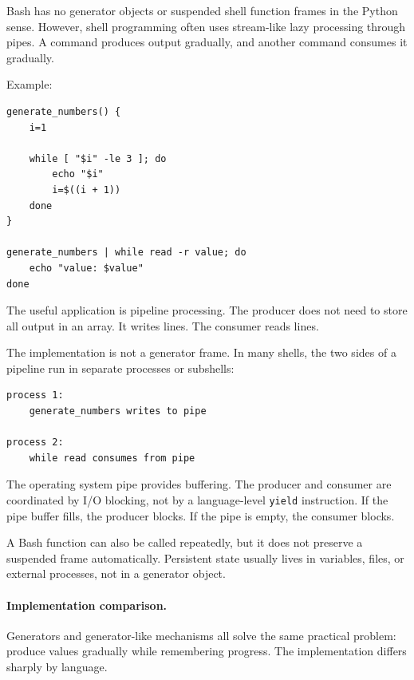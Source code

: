 Bash has no generator objects or suspended shell function frames in the Python sense. However, shell programming often uses stream-like lazy processing through pipes. A command produces output gradually, and another command consumes it gradually.

Example:

\begin{verbatim}
generate_numbers() {
    i=1

    while [ "$i" -le 3 ]; do
        echo "$i"
        i=$((i + 1))
    done
}

generate_numbers | while read -r value; do
    echo "value: $value"
done
\end{verbatim}

The useful application is pipeline processing. The producer does not need to store all output in an array. It writes lines. The consumer reads lines.

The implementation is not a generator frame. In many shells, the two sides of a pipeline run in separate processes or subshells:

\begin{verbatim}
process 1:
    generate_numbers writes to pipe

process 2:
    while read consumes from pipe
\end{verbatim}

The operating system pipe provides buffering. The producer and consumer are coordinated by I/O blocking, not by a language-level \texttt{yield} instruction. If the pipe buffer fills, the producer blocks. If the pipe is empty, the consumer blocks.

A Bash function can also be called repeatedly, but it does not preserve a suspended frame automatically. Persistent state usually lives in variables, files, or external processes, not in a generator object.

\paragraph{Implementation comparison.}

Generators and generator-like mechanisms all solve the same practical problem: produce values gradually while remembering progress. The implementation differs sharply by language.

